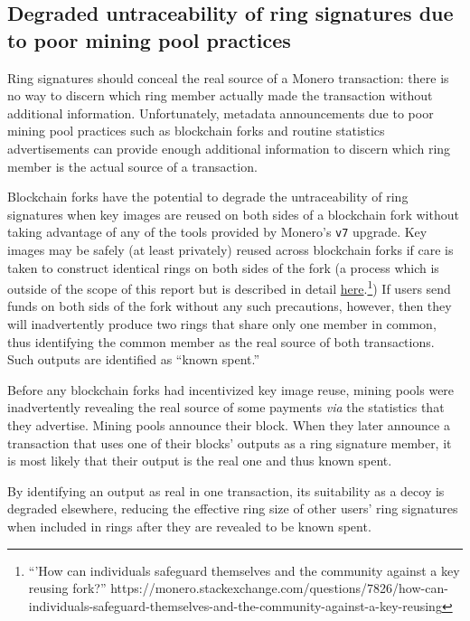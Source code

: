 \documentclass[notitlepage]{report}
\begin{document}
\subsection{Degraded untraceability of ring signatures due to poor mining pool practices}

Ring signatures should conceal the real source of a Monero transaction: there is no way to discern which ring member actually made the transaction without additional information.  Unfortunately, metadata announcements due to poor mining pool practices such as blockchain forks and routine statistics advertisements can provide enough additional information to discern which ring member is the actual source of a transaction.

Blockchain forks have the potential to degrade the untraceability of ring signatures when key images are reused on both sides of a blockchain fork without taking advantage of any of the tools provided by Monero's \verb/v7/ upgrade.  Key images may be safely (at least privately) reused across blockchain forks if care is taken to construct identical rings on both sides of the fork (a process which is outside of the scope of this report but is described in detail \href{https://monero.stackexchange.com/questions/7826/how-can-individuals-safeguard-themselves-and-the-community-against-a-key-reusing}{here}.\footnote{``'How can individuals safeguard themselves and the community against a key reusing fork?'' https://monero.stackexchange.com/questions/7826/how-can-individuals-safeguard-themselves-and-the-community-against-a-key-reusing})  If users send funds on both sids of the fork without any such precautions, however, then they will inadvertently produce two rings that share only one member in common, thus identifying the common member as the real source of both transactions.  Such outputs are identified as ``known spent.''

Before any blockchain forks had incentivized key image reuse, mining pools were inadvertently revealing the real source of some payments \textit{via} the statistics that they advertise.  Mining pools announce their block.  When they later announce a transaction that uses one of their blocks' outputs as a ring signature member, it is most likely that their output is the real one and thus known spent.

By identifying an output as real in one transaction, its suitability as a decoy is degraded elsewhere, reducing the effective ring size of other users' ring signatures when included in rings after they are revealed to be known spent.
\end{document}
